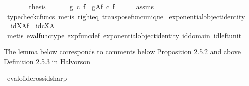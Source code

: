 \begin{isabellebody}
\ \ \ \ \isamarkupfalse%
\ \isamarkupfalse%
\ {\isacharquery}{\kern0pt}thesis\isacommand{{\isachardot}{\kern0pt}}\isamarkupfalse%
\isanewline
\ \ \isamarkupfalse%
\isanewline
\ \ \isamarkupfalse%
\ {\isachardoublequoteopen}{\isacharparenleft}{\kern0pt}g\ {\isasymcirc}\isactrlsub c\ f{\isacharparenright}{\kern0pt}\isactrlsup {\isasymsharp}\ {\isacharequal}{\kern0pt}\ g\isactrlbsup A\isactrlesup \isactrlsub f\ {\isasymcirc}\isactrlsub c\ f\isactrlsup {\isasymsharp}{\isachardoublequoteclose}\isanewline
\ \ \ \ \isamarkupfalse%
\ assms\ \isamarkupfalse%
\ {\isacharparenleft}{\kern0pt}typecheck{\isacharunderscore}{\kern0pt}cfuncs{\isacharcomma}{\kern0pt}\ metis\ right{\isacharunderscore}{\kern0pt}eq\ transpose{\isacharunderscore}{\kern0pt}func{\isacharunderscore}{\kern0pt}unique{\isacharparenright}{\kern0pt}\isanewline
{}\isamarkupfalse%
%
\endisatagproof
{\isafoldproof}%
%
\isadelimproof
\isanewline
%
\endisadelimproof
\isanewline
{}\isamarkupfalse%
\ exponential{\isacharunderscore}{\kern0pt}object{\isacharunderscore}{\kern0pt}identity{}{\isacharcolon}{\kern0pt}\ \isanewline
\ \ {\isachardoublequoteopen}id{\isacharparenleft}{\kern0pt}X{\isacharparenright}{\kern0pt}\isactrlbsup A\isactrlesup \isactrlsub f\ {\isacharequal}{\kern0pt}\ id\isactrlsub c{\isacharparenleft}{\kern0pt}X\isactrlbsup A\isactrlesup {\isacharparenright}{\kern0pt}{\isachardoublequoteclose}\isanewline
%
\isadelimproof
\ \ %
\endisadelimproof
%
\isatagproof
{}\isamarkupfalse%
\ {\isacharparenleft}{\kern0pt}metis\ eval{\isacharunderscore}{\kern0pt}func{\isacharunderscore}{\kern0pt}type\ exp{\isacharunderscore}{\kern0pt}func{\isacharunderscore}{\kern0pt}def\ exponential{\isacharunderscore}{\kern0pt}object{\isacharunderscore}{\kern0pt}identity\ id{\isacharunderscore}{\kern0pt}domain\ id{\isacharunderscore}{\kern0pt}left{\isacharunderscore}{\kern0pt}unit{}{\isacharparenright}{\kern0pt}%
\endisatagproof
{\isafoldproof}%
%
\isadelimproof
%
\endisadelimproof
%
\begin{isamarkuptext}%
The lemma below corresponds to comments below Proposition 2.5.2 and above Definition 2.5.3 in Halvorson.%
\end{isamarkuptext}\isamarkuptrue%
\isamarkupfalse%
\ eval{\isacharunderscore}{\kern0pt}of{\isacharunderscore}{\kern0pt}id{\isacharunderscore}{\kern0pt}cross{\isacharunderscore}{\kern0pt}id{\isacharunderscore}{\kern0pt}sharp{}{\isacharcolon}{\kern0pt}\isanewline

\end{isabellebody}
